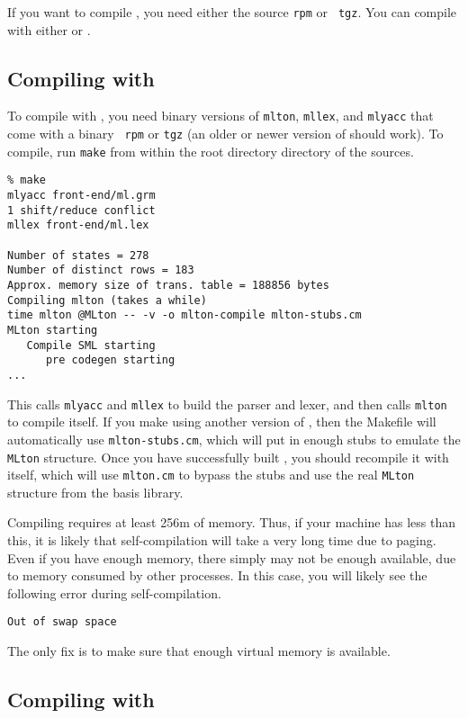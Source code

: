 
If you want to compile {\mlton}, you need either the source {\tt rpm} or {\tt
tgz}.  You can compile with either {\mlton} or {\smlnj}.

\subsection{Compiling with {\mlton}}

To compile with {\mlton}, you need binary versions of {\tt mlton},
{\tt mllex}, and {\tt mlyacc} that come with a {\mlton} binary {\tt
rpm} or {\tt tgz} (an older or newer version of {\mlton} should work).
To compile, run {\tt make} from within the root directory directory of the
sources.
\begin{verbatim}
% make
mlyacc front-end/ml.grm
1 shift/reduce conflict
mllex front-end/ml.lex

Number of states = 278
Number of distinct rows = 183
Approx. memory size of trans. table = 188856 bytes
Compiling mlton (takes a while)
time mlton @MLton -- -v -o mlton-compile mlton-stubs.cm
MLton starting
   Compile SML starting
      pre codegen starting
...
\end{verbatim}
This calls {\tt mlyacc} and {\tt mllex} to build the parser and lexer, and then
calls {\tt mlton} to compile itself.  If you make {\mlton} using another version
of {\mlton}, then the Makefile will automatically use {\tt mlton-stubs.cm},
which will put in enough stubs to emulate the {\tt MLton} structure.  Once you
have successfully built {\mlton}, you should recompile it with itself, which
will use {\tt mlton.cm} to bypass the stubs and use the real {\tt MLton}
structure from the basis library.

Compiling {\mlton} requires at least 256m of memory.  Thus, if your machine has
less than this, it is likely that self-compilation will take a very long time
due to paging.  Even if you have enough memory, there simply may not be enough
available, due to memory consumed by other processes.  In this case, you will
likely see the following error during self-compilation.
\begin{verbatim}
Out of swap space
\end{verbatim}
The only fix is to make sure that enough virtual memory is available.

\subsection{Compiling with {\smlnj}}

